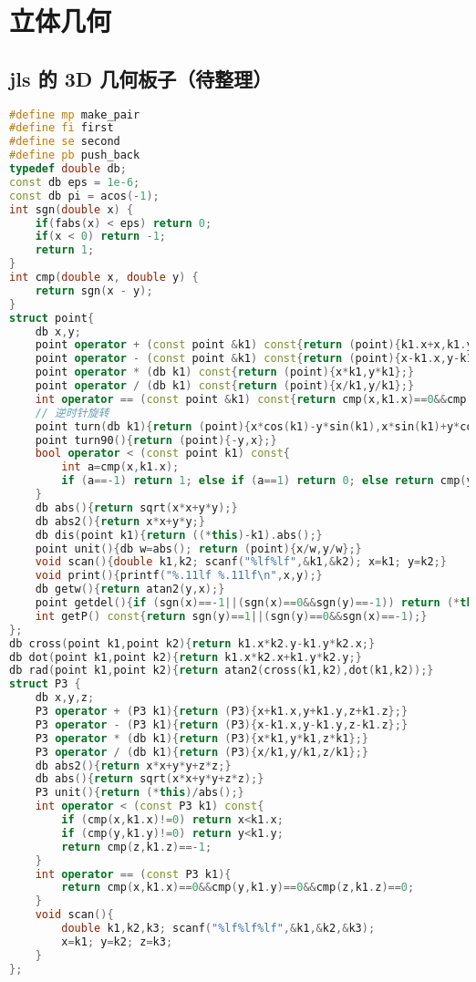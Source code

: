 

\section{立体几何}

\subsection{jls 的 3D 几何板子（待整理）}

\begin{lstlisting}[language=C++]
#define mp make_pair
#define fi first
#define se second
#define pb push_back
typedef double db;
const db eps = 1e-6;
const db pi = acos(-1);
int sgn(double x) {
    if(fabs(x) < eps) return 0;
    if(x < 0) return -1;
    return 1;
}
int cmp(double x, double y) {
    return sgn(x - y);
}
struct point{
    db x,y;
    point operator + (const point &k1) const{return (point){k1.x+x,k1.y+y};}
    point operator - (const point &k1) const{return (point){x-k1.x,y-k1.y};}
    point operator * (db k1) const{return (point){x*k1,y*k1};}
    point operator / (db k1) const{return (point){x/k1,y/k1};}
    int operator == (const point &k1) const{return cmp(x,k1.x)==0&&cmp(y,k1.y)==0;}
    // 逆时针旋转 
    point turn(db k1){return (point){x*cos(k1)-y*sin(k1),x*sin(k1)+y*cos(k1)};}
    point turn90(){return (point){-y,x};}
    bool operator < (const point k1) const{
        int a=cmp(x,k1.x);
        if (a==-1) return 1; else if (a==1) return 0; else return cmp(y,k1.y)==-1;
    }
    db abs(){return sqrt(x*x+y*y);}
    db abs2(){return x*x+y*y;}
    db dis(point k1){return ((*this)-k1).abs();}
    point unit(){db w=abs(); return (point){x/w,y/w};}
    void scan(){double k1,k2; scanf("%lf%lf",&k1,&k2); x=k1; y=k2;}
    void print(){printf("%.11lf %.11lf\n",x,y);}
    db getw(){return atan2(y,x);} 
    point getdel(){if (sgn(x)==-1||(sgn(x)==0&&sgn(y)==-1)) return (*this)*(-1); else return (*this);}
	int getP() const{return sgn(y)==1||(sgn(y)==0&&sgn(x)==-1);}
};
db cross(point k1,point k2){return k1.x*k2.y-k1.y*k2.x;}
db dot(point k1,point k2){return k1.x*k2.x+k1.y*k2.y;}
db rad(point k1,point k2){return atan2(cross(k1,k2),dot(k1,k2));}
struct P3 {
    db x,y,z;
    P3 operator + (P3 k1){return (P3){x+k1.x,y+k1.y,z+k1.z};}
    P3 operator - (P3 k1){return (P3){x-k1.x,y-k1.y,z-k1.z};}
    P3 operator * (db k1){return (P3){x*k1,y*k1,z*k1};}
    P3 operator / (db k1){return (P3){x/k1,y/k1,z/k1};}
    db abs2(){return x*x+y*y+z*z;}
    db abs(){return sqrt(x*x+y*y+z*z);}
    P3 unit(){return (*this)/abs();}
    int operator < (const P3 k1) const{
        if (cmp(x,k1.x)!=0) return x<k1.x;
        if (cmp(y,k1.y)!=0) return y<k1.y;
        return cmp(z,k1.z)==-1;
    }
    int operator == (const P3 k1){
        return cmp(x,k1.x)==0&&cmp(y,k1.y)==0&&cmp(z,k1.z)==0;
    }
    void scan(){
        double k1,k2,k3; scanf("%lf%lf%lf",&k1,&k2,&k3);
        x=k1; y=k2; z=k3;
    }
};


\end{lstlisting}
